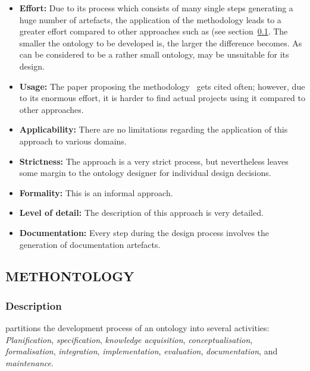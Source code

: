 \begin{itemize}
  \item \textbf{Effort:} Due to its process which consists of many single steps generating a huge number of artefacts, the application of the  methodology leads to a greater effort compared to other approaches such as \methontology (see section~\ref{subsec:approach5}. The smaller the ontology to be developed is, the larger the difference becomes. As \smarthomeweather can be considered to be a rather small ontology,  may be unsuitable for its design.
  
   \item \textbf{Usage:} The paper proposing the  methodology~\cite{SoftwareEngineeringOntology} gets cited often; however, due to its enormous effort, it is harder to find actual projects using it compared to other approaches.

  \item \textbf{Applicability:} There are no limitations regarding the application of this approach to various domains.
  
  \item \textbf{Strictness:} The  approach is a very strict process, but nevertheless leaves some margin to the ontology designer for individual design decisions.
  
  \item \textbf{Formality:} This is an informal approach.
  
  \item \textbf{Level of detail:} The description of this approach is very detailed.
  
  \item \textbf{Documentation:} Every step during the design process involves the generation of documentation artefacts.
\end{itemize}

\subsection{METHONTOLOGY}
\label{subsec:approach5}

\subsubsection{Description}

\methontology partitions the development process of an ontology into several activities: \emph{Planification}, \emph{specification}, \emph{knowledge acquisition}, \emph{conceptualisation}, \emph{formalisation}, \emph{integration}, \emph{implementation}, \emph{evaluation}, \emph{documentation}, and \emph{maintenance}.

